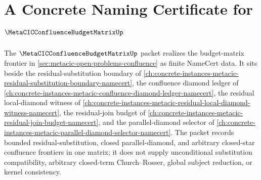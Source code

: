 \chapter{A Concrete Naming Certificate for $\MetaCICConfluenceBudgetMatrixUp$}
\label{ch:concrete-instances-metacic-confluence-budget-matrix-namecert}

The $\MetaCICConfluenceBudgetMatrixUp$ packet realizes the budget-matrix frontier in \autoref{sec:metacic-open-problems-confluence} as finite NameCert data. It sits beside the residual-substitution boundary of \autoref{ch:concrete-instances-metacic-residual-substitution-boundary-namecert}, the confluence diamond ledger of \autoref{ch:concrete-instances-metacic-confluence-diamond-ledger-namecert}, the residual local-diamond witness of \autoref{ch:concrete-instances-metacic-residual-local-diamond-witness-namecert}, the residual-join budget of \autoref{ch:concrete-instances-metacic-residual-join-budget-namecert}, and the parallel-diamond selector of \autoref{ch:concrete-instances-metacic-parallel-diamond-selector-namecert}. The packet records bounded residual-substitution, closed parallel-diamond, and arbitrary closed-star confluence frontiers in one matrix; it does not supply unconditional substitution compatibility, arbitrary closed-term Church--Rosser, global subject reduction, or kernel consistency.

